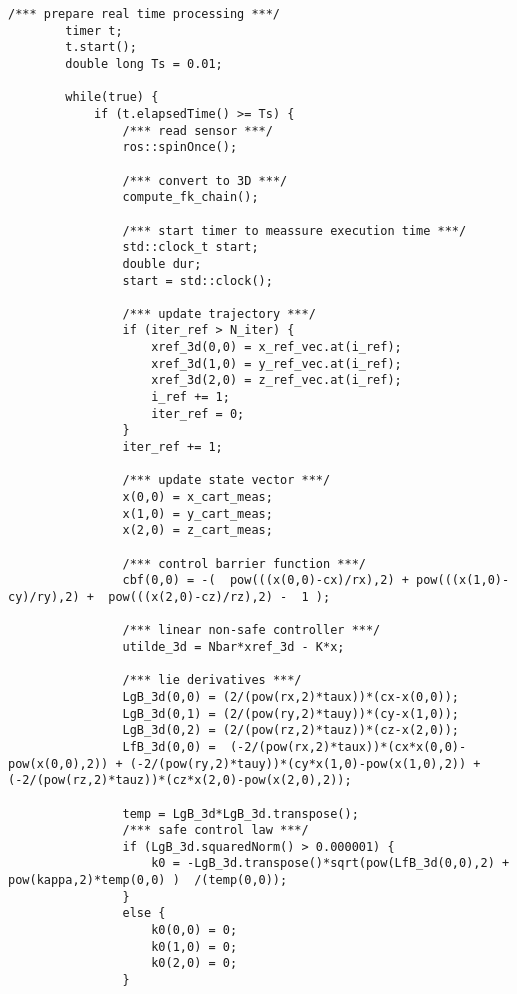 \begin{lstlisting}[language=gedit]
        /*** prepare real time processing ***/
        timer t;
        t.start();
        double long Ts = 0.01;

        while(true) {
            if (t.elapsedTime() >= Ts) {
                /*** read sensor ***/ 
                ros::spinOnce();

                /*** convert to 3D ***/ 
                compute_fk_chain();

                /*** start timer to meassure execution time ***/
                std::clock_t start;
                double dur;
                start = std::clock();               
   
                /*** update trajectory ***/ 
                if (iter_ref > N_iter) {
                    xref_3d(0,0) = x_ref_vec.at(i_ref);
                    xref_3d(1,0) = y_ref_vec.at(i_ref);
                    xref_3d(2,0) = z_ref_vec.at(i_ref);
                    i_ref += 1;
                    iter_ref = 0;
                }
                iter_ref += 1;

                /*** update state vector ***/
                x(0,0) = x_cart_meas;                
                x(1,0) = y_cart_meas;                
                x(2,0) = z_cart_meas;                

                /*** control barrier function ***/
                cbf(0,0) = -(  pow(((x(0,0)-cx)/rx),2) + pow(((x(1,0)-cy)/ry),2) +  pow(((x(2,0)-cz)/rz),2) -  1 );
                 
                /*** linear non-safe controller ***/
                utilde_3d = Nbar*xref_3d - K*x; 

                /*** lie derivatives ***/
                LgB_3d(0,0) = (2/(pow(rx,2)*taux))*(cx-x(0,0));
                LgB_3d(0,1) = (2/(pow(ry,2)*tauy))*(cy-x(1,0));
                LgB_3d(0,2) = (2/(pow(rz,2)*tauz))*(cz-x(2,0));
                LfB_3d(0,0) =  (-2/(pow(rx,2)*taux))*(cx*x(0,0)-pow(x(0,0),2)) + (-2/(pow(ry,2)*tauy))*(cy*x(1,0)-pow(x(1,0),2)) + (-2/(pow(rz,2)*tauz))*(cz*x(2,0)-pow(x(2,0),2));

                temp = LgB_3d*LgB_3d.transpose();  
                /*** safe control law ***/
                if (LgB_3d.squaredNorm() > 0.000001) {
                    k0 = -LgB_3d.transpose()*sqrt(pow(LfB_3d(0,0),2) + pow(kappa,2)*temp(0,0) )  /(temp(0,0));
                }
                else {
                    k0(0,0) = 0;
                    k0(1,0) = 0;
                    k0(2,0) = 0;
                }          
 

\end{lstlisting}
